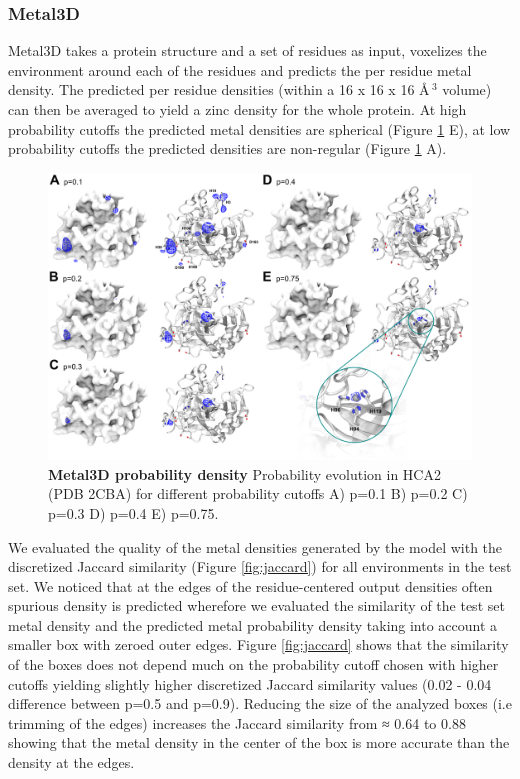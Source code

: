 \documentclass[  ASAPversion,
  ,
  9pt]{elife}
\begin{document}
\hypertarget{metal3d}{%
\subsubsection{Metal3D}\label{metal3d}}

Metal3D takes a protein structure and a set of residues as input, voxelizes the environment around each of the residues and predicts the per residue metal density. The predicted per residue densities (within a 16 x 16 x 16 \AA\,$^3$ volume) can then be averaged to yield a zinc density for the whole protein. At high probability cutoffs the predicted metal densities are spherical (Figure \ref{fig:2cbaprobabilities} E), at low probability cutoffs the predicted densities are non-regular (Figure \ref{fig:2cbaprobabilities} A).

\begin{figure}
\hypertarget{fig:2cbaprobabilities}{%
\centering
\includegraphics{images/2CBA_probabilities.png}
\caption{\textbf{Metal3D probability density} Probability evolution in HCA2 (PDB 2CBA) for different probability cutoffs A) p=0.1 B) p=0.2 C) p=0.3 D) p=0.4 E) p=0.75.}\label{fig:2cbaprobabilities}
}
\end{figure}

We evaluated the quality of the metal densities generated by the model with the discretized Jaccard similarity (Figure \ref{fig:jaccard}) for all environments in the test set. We noticed that at the edges of the residue-centered output densities often spurious density is predicted wherefore we evaluated the similarity of the test set metal density and the predicted metal probability density taking into account a smaller box with zeroed outer edges. Figure \ref{fig:jaccard} shows that the similarity of the boxes does not depend much on the probability cutoff chosen with higher cutoffs yielding slightly higher discretized Jaccard similarity values (0.02 - 0.04 difference between p=0.5 and p=0.9). Reducing the size of the analyzed boxes (i.e trimming of the edges) increases the Jaccard similarity from ≈ 0.64 to 0.88 showing that the metal density in the center of the box is more accurate than the density at the edges.
\end{document}
